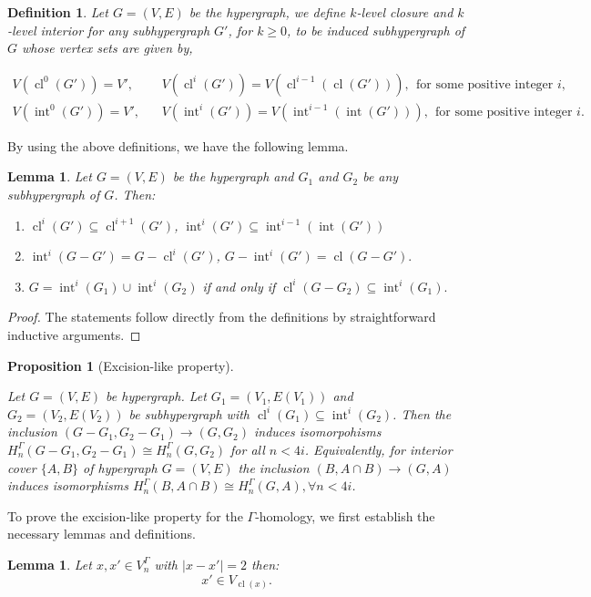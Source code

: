 \documentclass[11pt]{amsart}
\newtheorem{Def}[subsection]{Definition}
\newtheorem{prop}[subsection]{Proposition}
\newtheorem{lem}[subsection]{Lemma}
\newcommand{\cl}{\operatorname{cl}}
\renewcommand{\int}{\operatorname{int}}
\begin{document}
\begin{Def}
Let $G=(V,E)$ be the hypergraph, we define $k$-level closure and $k$-level interior for any subhypergraph $G'$, for $k\ge 0$, to be induced subhypergraph of $G$ whose vertex sets are given by, 

\begin{equation*} \begin{split}
    V(\cl^0(G'))=V', & ~~~~ V(\cl^{i}(G')) = V(\cl^{i-1}(\cl(G'))), ~~\text{for some positive integer } i,\\
V(\int^0(G')) =V', & ~~~~ V(\int^i(G'))=V(\int^{i-1}(\int(G'))), ~~ \text{for some positive integer } i.\end{split}
\end{equation*}

\medskip

\end{Def}
By using the above definitions, we have the following lemma.
\begin{lem}\label{iterative int and cl}
Let $G=(V, E)$ be the hypergraph and $G_1$ and $G_2$ be any subhypergraph of $G$. Then:
\begin{enumerate}
	\item ${\cl^{i}(G')} \subseteq {\cl^{i+1}(G')}$, $\int^{i}(G')\subseteq \int^{i-1}(\int(G'))$
	\item  $\int^i(G-G')=G-\cl^i(G')$, $G-\int^i(G')=\cl(G-G').$
	\item $G=\int^i(G_1)\cup \int^i(G_2)$ if and only if $\cl^i(G-G_2)\subseteq \int^i(G_1).$
\end{enumerate}
\end{lem}

\begin{proof}
The statements follow directly from the definitions by straightforward inductive arguments.
\end{proof}

\begin{prop}[Excision-like property]\label{gamma excion-like}

Let $G=(V,E)$ be hypergraph. Let $G_1=(V_1,E(V_1))$ and $G_2=(V_2,E(V_2))$ be subhypergraph with $\cl^i(G_1)\subseteq \int^i(G_2)$. Then the inclusion $(G-G_1,G_2-G_1)\rightarrow (G,G_2)$ induces isomorpohisms $H_{n}^\Gamma(G-G_1,G_2-G_1)\cong H_{n}^\Gamma(G,G_2)$ for all $n< 4i$. Equivalently, for interior cover $\{A,B\}$ of hypergraph $G=(V,E)$ the inclusion $(B,A\cap B)\rightarrow (G,A)$ induces isomorphisms $H_{n}^\Gamma(B,A\cap B)\cong H_{n}^\Gamma(G,A), \forall n<4i$.
\end{prop}
To prove the excision-like property for the $\Gamma$-homology, we first establish the necessary lemmas and definitions.
\begin{lem}\label{x-x'=2}
    Let $x,x'\in V_n^\Gamma$ with $|x-x'|=2$ then:
        $$x' \in V_{\operatorname{cl}(x)}.$$
\end{lem}
\end{document}
